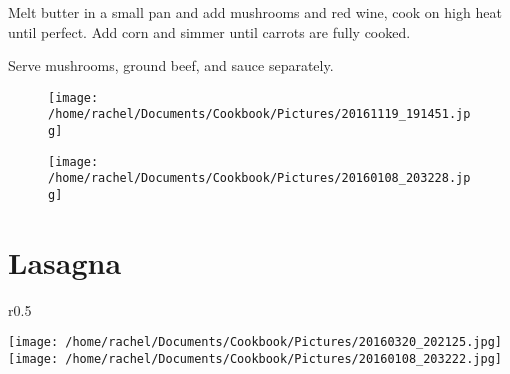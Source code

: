 \documentclass{article}
\begin{document}
Melt butter in a small pan and add mushrooms and red wine, cook on high heat until perfect. Add corn and simmer until carrots are fully cooked.

Serve mushrooms, ground beef, and sauce separately.

\restoregeometry


\newpage
\begin{figure}[]
\texttt{[image: /home/rachel/Documents/Cookbook/Pictures/20161119\_191451.jpg]}
\end{figure}
\restoregeometry
\clearpage
\newpage
{}










\newpage
\begin{figure}[]
\texttt{[image: /home/rachel/Documents/Cookbook/Pictures/20160108\_203228.jpg]}
\end{figure}
\restoregeometry
\clearpage
\newpage
{}



\section*{\fontsize{25}{15}\selectfont Lasagna}

\begin{wrapfigure}{r}{0.5\textwidth}
\
  \begin{center}
 	\hfill\begin{minipage}{.5\textwidth}\centering
 	\vspace*{-4.3cm}
		\texttt{[image: /home/rachel/Documents/Cookbook/Pictures/20160320\_202125.jpg]}
		\\[5mm]
		\texttt{[image: /home/rachel/Documents/Cookbook/Pictures/20160108\_203222.jpg]}
	\end{minipage}  
	\end{center}

\end{wrapfigure}
\end{document}
